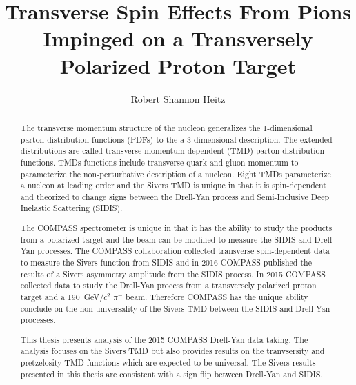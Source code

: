 \documentclass[edeposit,fullpage]{Classes/uiucthesis2009}
\newcommand{\gvcw}{GeV/$c^2$} \newcommand{\mvcw}{MeV/$c^2$}
\begin{document}
\title{Transverse Spin Effects From Pions Impinged on a Transversely Polarized
  Proton Target}

\author{Robert Shannon Heitz}
\phdthesis
{}
  
\maketitle

\frontmatter

\begin{abstract}
The transverse momentum structure of the nucleon generalizes the 1-dimensional
parton distribution functions (PDFs) to the a 3-dimensional description.  The
extended distributions are called transverse momentum dependent (TMD) parton
distribution functions.  TMDs functions include transverse quark and gluon
momentum to parameterize the non-perturbative description of a nucleon.  Eight
TMDs parameterize a nucleon at leading order and the Sivers TMD is unique in
that it is spin-dependent and theorized to change signs between the Drell-Yan
process and Semi-Inclusive Deep Inelastic Scattering (SIDIS).

The COMPASS spectrometer is unique in that it has the ability to study the
products from a polarized target and the beam can be modified to measure the
SIDIS and Drell-Yan processes.  The COMPASS collaboration collected transverse
spin-dependent data to measure the Sivers function from SIDIS and in 2016
COMPASS published the results of a Sivers asymmetry amplitude from the SIDIS
process.  In 2015 COMPASS collected data to study the Drell-Yan process from a
transversely polarized proton target and a 190~{\gvcw} $\pi^-$ beam.  Therefore
COMPASS has the unique ability conclude on the non-universality of the Sivers
TMD between the SIDIS and Drell-Yan processes.

This thesis presents analysis of the 2015 COMPASS Drell-Yan data taking.  The
analysis focuses on the Sivers TMD but also provides results on the tranvsersity
and pretzelosity TMD functions which are expected to be universal.  The Sivers
results presented in this thesis are consistent with a sign flip between
Drell-Yan and SIDIS.
\end{abstract}
\end{document}
